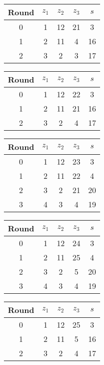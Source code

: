 \begin{table}
\begin{tabular}{c | c | c | c | c }
Round & $z_1$ & $z_2$ & $z_3$ & $s$ \\
\hline
0 & 1 & 12 & 21 & 3 \\
1 & 2 & 11 & 4 & 16 \\
2 & 3 & 2 & 3 & 17
\end{tabular}
\end{table}

\begin{table}
\begin{tabular}{c | c | c | c | c }
Round & $z_1$ & $z_2$ & $z_3$ & $s$ \\
\hline
0 & 1 & 12 & 22 & 3 \\
1 & 2 & 11 & 21 & 16 \\
2 & 3 & 2 & 4 & 17
\end{tabular}
\end{table}

\begin{table}
\begin{tabular}{c | c | c | c | c }
Round & $z_1$ & $z_2$ & $z_3$ & $s$ \\
\hline
0 & 1 & 12 & 23 & 3 \\
1 & 2 & 11 & 22 & 4 \\
2 & 3 & 2 & 21 & 20 \\
3 & 4 & 3 & 4 & 19
\end{tabular}
\end{table}

\begin{table}
\begin{tabular}{c | c | c | c | c }
Round & $z_1$ & $z_2$ & $z_3$ & $s$ \\
\hline
0 & 1 & 12 & 24 & 3 \\
1 & 2 & 11 & 25 & 4 \\
2 & 3 & 2 & 5 & 20 \\
3 & 4 & 3 & 4 & 19
\end{tabular}
\end{table}

\begin{table}
\begin{tabular}{c | c | c | c | c }
Round & $z_1$ & $z_2$ & $z_3$ & $s$ \\
\hline
0 & 1 & 12 & 25 & 3 \\
1 & 2 & 11 & 5 & 16 \\
2 & 3 & 2 & 4 & 17
\end{tabular}
\end{table}

